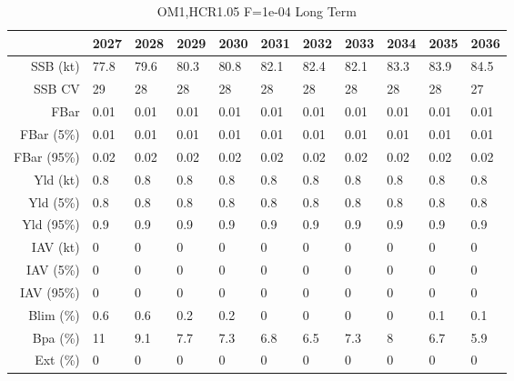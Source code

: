 \begin{table}[ht]
\centering
\begin{tabular}{rllllllllll}
  \hline
 & 2027 & 2028 & 2029 & 2030 & 2031 & 2032 & 2033 & 2034 & 2035 & 2036 \\ 
  \hline
SSB (kt) & 77.8 & 79.6 & 80.3 & 80.8 & 82.1 & 82.4 & 82.1 & 83.3 & 83.9 & 84.5 \\ 
  SSB CV & 29 & 28 & 28 & 28 & 28 & 28 & 28 & 28 & 28 & 27 \\ 
   \hline
FBar & 0.01 & 0.01 & 0.01 & 0.01 & 0.01 & 0.01 & 0.01 & 0.01 & 0.01 & 0.01 \\ 
  FBar (5\%) & 0.01 & 0.01 & 0.01 & 0.01 & 0.01 & 0.01 & 0.01 & 0.01 & 0.01 & 0.01 \\ 
  FBar (95\%) & 0.02 & 0.02 & 0.02 & 0.02 & 0.02 & 0.02 & 0.02 & 0.02 & 0.02 & 0.02 \\ 
   \hline
Yld (kt) & 0.8 & 0.8 & 0.8 & 0.8 & 0.8 & 0.8 & 0.8 & 0.8 & 0.8 & 0.8 \\ 
  Yld (5\%) & 0.8 & 0.8 & 0.8 & 0.8 & 0.8 & 0.8 & 0.8 & 0.8 & 0.8 & 0.8 \\ 
  Yld (95\%) & 0.9 & 0.9 & 0.9 & 0.9 & 0.9 & 0.9 & 0.9 & 0.9 & 0.9 & 0.9 \\ 
   \hline
IAV (kt) & 0 & 0 & 0 & 0 & 0 & 0 & 0 & 0 & 0 & 0 \\ 
  IAV (5\%) & 0 & 0 & 0 & 0 & 0 & 0 & 0 & 0 & 0 & 0 \\ 
  IAV (95\%) & 0 & 0 & 0 & 0 & 0 & 0 & 0 & 0 & 0 & 0 \\ 
   \hline
Blim (\%) & \cellcolor{green}0.6 & \cellcolor{green}0.6 & \cellcolor{green}0.2 & \cellcolor{green}0.2 & \cellcolor{green}0 & \cellcolor{green}0 & \cellcolor{green}0 & \cellcolor{green}0 & \cellcolor{green}0.1 & \cellcolor{green}0.1 \\ 
  Bpa (\%) & 11 & 9.1 & 7.7 & 7.3 & 6.8 & 6.5 & 7.3 & 8 & 6.7 & 5.9 \\ 
  Ext (\%) & 0 & 0 & 0 & 0 & 0 & 0 & 0 & 0 & 0 & 0 \\ 
   \hline
\end{tabular}
\caption{OM1,HCR1.05 F=1e-04 Long Term} 
\end{table}

